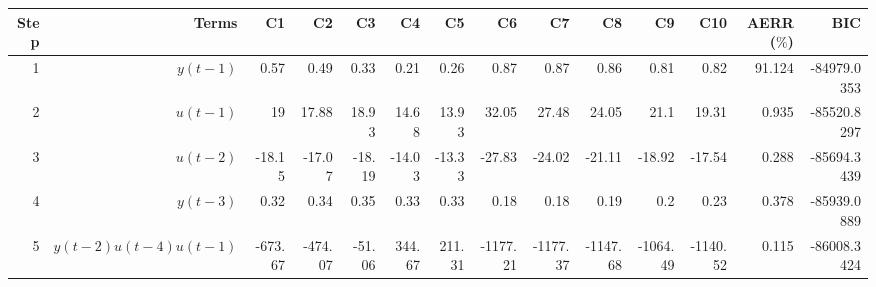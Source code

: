 \begin{tabular}{rrrrrrrrrrrrrr}
Step & Terms & C1 & C2 & C3 & C4 & C5 & C6 & C7 & C8 & C9 & C10 & AERR($\%$) & BIC \\ 
\hline 
1 & $y(t-1)$ & 0.57 & 0.49 & 0.33 & 0.21 & 0.26 & 0.87 & 0.87 & 0.86 & 0.81 & 0.82 & 91.124 & -84979.0353 \\ 
2 & $u(t-1)$ & 19 & 17.88 & 18.93 & 14.68 & 13.93 & 32.05 & 27.48 & 24.05 & 21.1 & 19.31 & 0.935 & -85520.8297 \\ 
3 & $u(t-2)$ & -18.15 & -17.07 & -18.19 & -14.03 & -13.33 & -27.83 & -24.02 & -21.11 & -18.92 & -17.54 & 0.288 & -85694.3439 \\ 
4 & $y(t-3)$ & 0.32 & 0.34 & 0.35 & 0.33 & 0.33 & 0.18 & 0.18 & 0.19 & 0.2 & 0.23 & 0.378 & -85939.0889 \\ 
5 & $y(t-2)u(t-4)u(t-1)$ & -673.67 & -474.07 & -51.06 & 344.67 & 211.31 & -1177.21 & -1177.37 & -1147.68 & -1064.49 & -1140.52 & 0.115 & -86008.3424 \\ 
\hline 
\end{tabular}